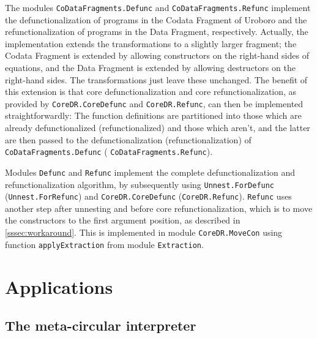 The modules \texttt{CoDataFragments.Defunc} and \texttt{CoDataFragments.Refunc} implement the defunctionalization of programs in the Codata Fragment of Uroboro and the refunctionalization of programs in the Data Fragment, respectively. Actually, the implementation extends the transformations to a slightly larger fragment; the Codata Fragment is extended by allowing constructors on the right-hand sides of equations, and the Data Fragment is extended by allowing destructors on the right-hand sides. The transformations just leave these unchanged. The benefit of this extension is that core defunctionalization and core refunctionalization, as provided by \texttt{CoreDR.CoreDefunc} and \texttt{CoreDR.Refunc}, can then be implemented straightforwardly: The function definitions are partitioned into those which are already defunctionalized (refunctionalized) and those which aren't, and the latter are then passed to the defunctionalization (refunctionalization) of \texttt{CoDataFragments.Defunc} ( \texttt{CoDataFragments.Refunc}).

Modules \texttt{Defunc} and \texttt{Refunc} implement the complete defunctionalization and refunctionalization algorithm, by subsequently using \texttt{Unnest.ForDefunc} (\texttt{Unnest.ForRefunc}) and \texttt{CoreDR.CoreDefunc} (\texttt{CoreDR.Refunc}). \texttt{Refunc} uses another step after unnesting and before core refunctionalization, which is to move the constructors to the first argument position, as described in \autoref{sssec:workaround}. This is implemented in module \texttt{CoreDR.MoveCon} using function \texttt{applyExtraction} from module \texttt{Extraction}.

\section{Applications}
\label{sec:appl}

\subsection{The meta-circular interpreter}
\label{ssec:mci}

